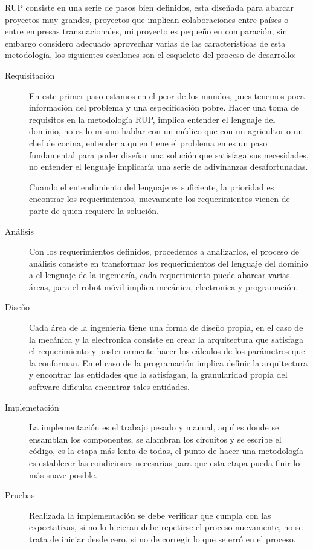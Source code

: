 RUP consiste en una serie de pasos bien definidos, esta diseñada para abarcar 
proyectos muy grandes, proyectos que implican colaboraciones entre países o entre
empresas transnacionales, mi proyecto es pequeño en comparación, sin embargo 
considero adecuado aprovechar varias de las características de esta metodología,
los siguientes escalones son el esqueleto del proceso de desarrollo:
\begin{description}
	\item[Requisitación] En este primer paso estamos en el peor de los mundos, pues
		tenemos poca información del problema y una especificación pobre.
		Hacer una toma de requisitos en la metodología RUP, implica 
		entender el lenguaje del dominio, no es lo mismo hablar con un
		médico que con
		un agricultor o un chef de cocina, entender a quien tiene el 
		problema en es un paso fundamental para poder diseñar
		una solución que satisfaga sus necesidades, no entender el 
		lenguaje implicaría una serie de adivinanzas desafortunadas.

		Cuando el entendimiento del lenguaje es suficiente, la prioridad
		es encontrar los requerimientos, nuevamente los requerimientos 
		vienen de parte de quien requiere la solución.
	\item[Análisis] Con los requerimientos definidos, procedemos a analizarlos,
		el proceso de análisis consiste en transformar los
		requerimientos del lenguaje del dominio a el lenguaje de la 
		ingeniería, cada requerimiento 
		puede abarcar varias áreas, para el robot móvil implica 
		mecánica, electronica y programación. 
	\item[Diseño] Cada área de la ingeniería tiene una forma de diseño propia,
		en el caso de la mecánica y la electronica consiste en crear la 
		arquitectura que satisfaga el requerimiento y posteriormente 
		hacer los cálculos de los parámetros que la
		conforman. En el caso de la programación implica definir la 
		arquitectura y encontrar las entidades que la satisfagan, la 
		granularidad propia del software dificulta encontrar tales 
		entidades. 
	\item[Implemetación] La implementación es el trabajo pesado y manual, 
		aquí es donde se ensamblan los componentes, se alambran los 
		circuitos y se escribe el código, es la etapa más lenta de todas,
		el punto de hacer una metodología es establecer las condiciones
		necesarias
		para que esta etapa pueda fluir lo más suave posible.
	\item[Pruebas] Realizada la implementación se debe verificar que cumpla 
		con las expectativas, si no lo hicieran debe repetirse el proceso
		nuevamente, no se trata de iniciar desde cero, si no de corregir
		lo que se erró en el proceso.
\end{description}

